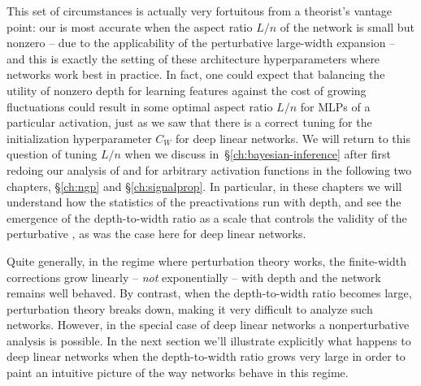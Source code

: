 This set of circumstances is actually very fortuitous from a theorist's vantage point: our  is most accurate when the 
aspect ratio
$L/n$ of the network is small but nonzero -- due to the applicability of the perturbative large-width expansion -- and this is exactly the setting of these architecture hyperparameters where networks work best
in practice.
In fact, one could expect that balancing the utility of nonzero depth for learning features against the cost of growing fluctuations 
could result in some optimal
aspect ratio  $L/n$ for MLPs of a particular activation, just as we saw that there is a correct tuning for the initialization hyperparameter $C_W$ for deep linear networks. We will return to this question of tuning $L/n$ when we discuss  in~\S\ref{ch:bayesian-inference} after first redoing our analysis of 
 and  %
for arbitrary activation functions
in the following two chapters, \S\ref{ch:ngp} and \S\ref{ch:signalprop}. In particular, in these chapters we will understand how the statistics of the preactivations run with depth, and see the emergence of the depth-to-width ratio as a scale that controls the validity of 
the perturbative , as was the case here for deep linear networks.



Quite generally, in the regime where perturbation theory works, the finite-width corrections grow linearly -- \emph{not} exponentially -- with depth and the network remains well behaved. By contrast, when the depth-to-width ratio becomes large, perturbation theory breaks down, making it very difficult to analyze such networks. However, in the special case of deep linear networks a nonperturbative analysis is possible. In the next section we'll illustrate explicitly what happens to deep linear networks when the depth-to-width ratio grows very large in order to paint an intuitive picture of the way networks behave in this regime.

























